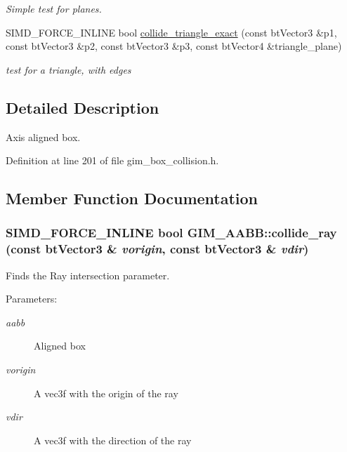 \begin{CompactItemize}
\begin{CompactList}\small\item\em Simple test for planes. \item\end{CompactList}\item 
\hypertarget{class_g_i_m___a_a_b_b_4a1ffa196d3981313fccf9e01aa383f9}{
SIMD\_\-FORCE\_\-INLINE bool \hyperlink{class_g_i_m___a_a_b_b_4a1ffa196d3981313fccf9e01aa383f9}{collide\_\-triangle\_\-exact} (const btVector3 \&p1, const btVector3 \&p2, const btVector3 \&p3, const btVector4 \&triangle\_\-plane)}
\label{class_g_i_m___a_a_b_b_4a1ffa196d3981313fccf9e01aa383f9}

\begin{CompactList}\small\item\em test for a triangle, with edges \item\end{CompactList}\end{CompactItemize}


\subsection{Detailed Description}
Axis aligned box. 

Definition at line 201 of file gim\_\-box\_\-collision.h.

\subsection{Member Function Documentation}
\hypertarget{class_g_i_m___a_a_b_b_1fafc37703d288fd0fe862b861829287}{
\subsubsection[collide\_\-ray]{\setlength{\rightskip}{0pt plus 5cm}SIMD\_\-FORCE\_\-INLINE bool GIM\_\-AABB::collide\_\-ray (const btVector3 \& {\em vorigin}, \/  const btVector3 \& {\em vdir})}}
\label{class_g_i_m___a_a_b_b_1fafc37703d288fd0fe862b861829287}


Finds the Ray intersection parameter. 

\begin{Desc}
\item[Parameters:]
\begin{description}
\item[{\em aabb}]Aligned box \item[{\em vorigin}]A vec3f with the origin of the ray \item[{\em vdir}]A vec3f with the direction of the ray \end{description}
\end{Desc}


